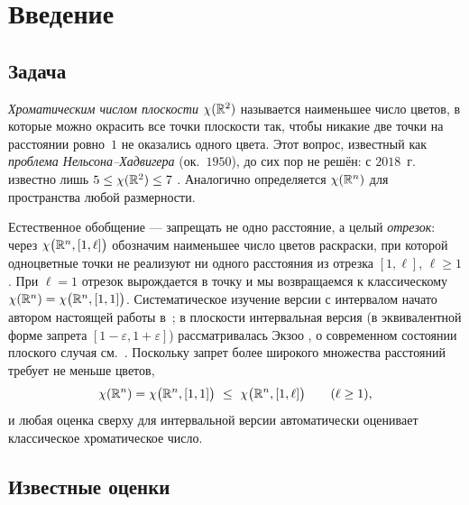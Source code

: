 \section{Введение}\label{sec:intro}

\subsection{Задача}

\emph{Хроматическим числом плоскости} $\chi(\mathbb{R}^2)$ называется наименьшее число
цветов, в которые можно окрасить все точки плоскости так, чтобы никакие две
точки на расстоянии ровно~$1$ не оказались одного цвета. Этот вопрос, известный
как \emph{проблема Нельсона--Хадвигера} (ок.~$1950$), до сих пор не решён: с
$2018$~г. известно лишь $5\le\chi(\mathbb{R}^2)\le7$ \cite{deGrey,Soifer}. Аналогично
определяется $\chi(\mathbb{R}^n)$ для пространства любой размерности.

Естественное обобщение --- запрещать не одно расстояние, а целый \emph{отрезок}:
через $\chi\bigl(\mathbb{R}^n,[1,\ell]\bigr)$ обозначим наименьшее число цветов
раскраски, при которой одноцветные точки не реализуют ни одного расстояния из
отрезка $[1,\ell]$, $\ell\ge1$. При $\ell=1$ отрезок вырождается в точку и мы
возвращаемся к классическому $\chi(\mathbb{R}^n)=\chi\bigl(\mathbb{R}^n,[1,1]\bigr)$.
Систематическое изучение версии с интервалом начато автором настоящей работы
в~\cite{Ivanov2011}; в плоскости интервальная версия (в эквивалентной форме
запрета $[1-\varepsilon,1+\varepsilon]$) рассматривалась Экзоо
\cite{Exoo2005}, о современном состоянии плоского случая
см.~\cite{ChJW,deGreyParts,Parts2023}. Поскольку запрет более широкого
множества расстояний требует не меньше цветов,
\begin{equation}\label{eq:mono}
\chi(\R^n)=\chi\bigl(\R^n,[1,1]\bigr)\ \le\ \chi\bigl(\R^n,[1,\ell]\bigr)
\qquad(\ell\ge1),
\end{equation}
и любая оценка сверху для интервальной версии автоматически оценивает
классическое хроматическое число.

\subsection{Известные оценки}

